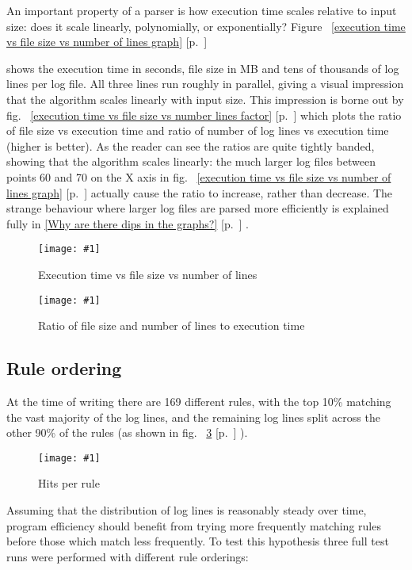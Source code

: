 \documentclass[draft]{svmult}
\newcommand{\showgraph}[3]{
    \begin{figure}[hbt!]
        \caption{#2}\label{#3}
        \texttt{[image: \#1]}
    \end{figure}
}
\newcommand{\refwithpage}[1]{%
    \empty{}\ref{#1} [p.~\pageref{#1}]%
}
\newcommand{\sectionref}[1]{%
    \textsection{}\refwithpage{#1}%
}
\newcommand{\numberOFrules}[0]{%
    169%
}
\begin{document}
An important property of a parser is how execution time scales relative to
input size: does it scale linearly, polynomially, or exponentially?
Figure~\refwithpage{execution time vs file size vs number of lines graph}
shows the execution time in seconds, file size in MB and tens of thousands
of log lines per log file.  All three lines run roughly in parallel, giving
a visual impression that the algorithm scales linearly with input size.
This impression is borne out by fig.~\refwithpage{execution time vs file
size vs number lines factor} which plots the ratio of file size vs
execution time and ratio of number of log lines vs execution time (higher
is better).  As the reader can see the ratios are quite tightly banded,
showing that the algorithm scales linearly: the much larger log files
between points 60 and 70 on the X axis in fig.~\refwithpage{execution time
vs file size vs number of lines graph} actually cause the ratio to
increase, rather than decrease.  The strange behaviour where larger log
files are parsed more efficiently is explained fully in \sectionref{Why are
there dips in the graphs?}.  

\showgraph{build/plot-normal-filesize-numlines}{Execution time vs file
size vs number of lines}{execution time vs file size vs number of lines
graph}

\showgraph{build/plot-normal-filesize-numlines-factor}{Ratio of file
size and number of lines to execution time}{execution time vs file size vs
number lines factor}

\subsection{Rule ordering}

\label{Rule ordering}
\label{rule ordering for efficiency}
\label{rule efficiency}

At the time of writing there are \numberOFrules{} different rules, with the
top 10\% matching the vast majority of the log lines, and the remaining log
lines split across the other 90\% of the rules (as shown in
fig.~\refwithpage{rule hits graph}).  \showgraph{build/plot-hits}{Hits per
rule}{rule hits graph} Assuming that the distribution of log lines is
reasonably steady over time, program efficiency should benefit from trying
more frequently matching rules before those which match less frequently.
To test this hypothesis three full test runs were performed with different
rule orderings:
\end{document}
